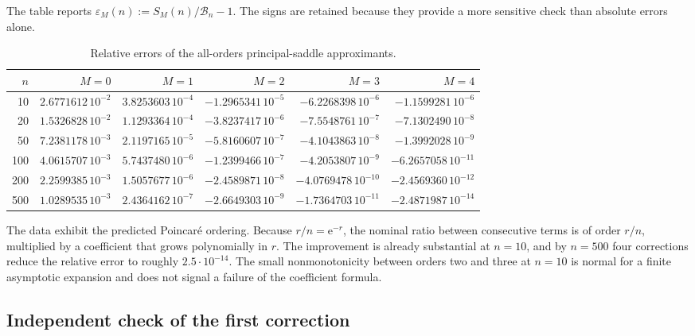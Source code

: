 \documentclass[11pt,a4paper]{article}
\theoremstyle{definition}
\theoremstyle{remark}
\newcommand{\Bell}{\mathcal B}
\newcommand{\ee}{\mathrm e}
\begin{document}
The table reports
\(\varepsilon_M(n):=S_M(n)/\Bell_n-1\).  The signs are retained because they
provide a more sensitive check than absolute errors alone.

\begin{table}[htbp]
\centering
\caption{Relative errors of the all-orders principal-saddle approximants.}
\label{tab:relative-errors}
\small
\setlength{\tabcolsep}{4.4pt}
\begin{tabular}{r@{\qquad}rrrrr}
\toprule
\(n\) & \(M=0\) & \(M=1\) & \(M=2\) & \(M=3\) & \(M=4\)\\
\midrule
10  & \( 2.6771612\,10^{-2}\) & \( 3.8253603\,10^{-4}\) & \(-1.2965341\,10^{-5}\) & \(-6.2268398\,10^{-6}\) & \(-1.1599281\,10^{-6}\)\\
20  & \( 1.5326828\,10^{-2}\) & \( 1.1293364\,10^{-4}\) & \(-3.8237417\,10^{-6}\) & \(-7.5548761\,10^{-7}\) & \(-7.1302490\,10^{-8}\)\\
50  & \( 7.2381178\,10^{-3}\) & \( 2.1197165\,10^{-5}\) & \(-5.8160607\,10^{-7}\) & \(-4.1043863\,10^{-8}\) & \(-1.3992028\,10^{-9}\)\\
100 & \( 4.0615707\,10^{-3}\) & \( 5.7437480\,10^{-6}\) & \(-1.2399466\,10^{-7}\) & \(-4.2053807\,10^{-9}\) & \(-6.2657058\,10^{-11}\)\\
200 & \( 2.2599385\,10^{-3}\) & \( 1.5057677\,10^{-6}\) & \(-2.4589871\,10^{-8}\) & \(-4.0769478\,10^{-10}\) & \(-2.4569360\,10^{-12}\)\\
500 & \( 1.0289535\,10^{-3}\) & \( 2.4364162\,10^{-7}\) & \(-2.6649303\,10^{-9}\) & \(-1.7364703\,10^{-11}\) & \(-2.4871987\,10^{-14}\)\\
\bottomrule
\end{tabular}
\end{table}

The data exhibit the predicted Poincar\'e ordering.  Because
\(r/n=\ee^{-r}\), the nominal ratio between consecutive terms is of order
\(r/n\), multiplied by a coefficient that grows polynomially in \(r\).  The
improvement is already substantial at \(n=10\), and by \(n=500\) four
corrections reduce the relative error to roughly \(2.5\cdot10^{-14}\).
The small nonmonotonicity between orders two and three at \(n=10\) is normal
for a finite asymptotic expansion and does not signal a failure of the
coefficient formula.

\subsection{Independent check of the first correction}
\end{document}
